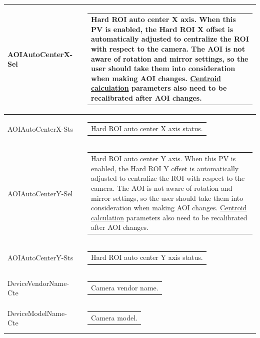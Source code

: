 \documentclass[openany]{article}
\begin{document}
\begin{longtable}{| m{3.0cm} m{4.5cm} m{7.0cm} |}
        AOIAutoCenterX-Sel &  & \begin{tabular}{@{}m{6cm}@{}}
                Hard ROI auto center X axis. When this PV is enabled, the Hard ROI X offset 
                is automatically adjusted to centralize the ROI with respect to the camera.
                The AOI is not aware of rotation and mirror settings, so the user should
                take them into consideration when making AOI changes.
                \hyperref[sec:centroid-calc]{Centroid calculation} parameters also need to
                be recalibrated after AOI changes.
            \end{tabular} \\ \hline
        AOIAutoCenterX-Sts &  & \begin{tabular}{@{}m{6cm}@{}}
                Hard ROI auto center X axis status.
            \end{tabular} \hypertarget{pv:hard-roi-auto-center-y}{}\\ \hline
        AOIAutoCenterY-Sel &  & \begin{tabular}{@{}m{6cm}@{}}
                Hard ROI auto center Y axis. When this PV is enabled, the Hard ROI Y offset 
                is automatically adjusted to centralize the ROI with respect to the camera.
                The AOI is not aware of rotation and mirror settings, so the user should
                take them into consideration when making AOI changes.
                \hyperref[sec:centroid-calc]{Centroid calculation} parameters also need to
                be recalibrated after AOI changes.
            \end{tabular} \\ \hline
        AOIAutoCenterY-Sts &  & \begin{tabular}{@{}m{6cm}@{}}
                Hard ROI auto center Y axis status.
            \end{tabular} \hypertarget{pv:vendor-name}{}\\ \hline
        DeviceVendorName-Cte &  & \begin{tabular}{@{}m{6cm}@{}}
                Camera vendor name.
            \end{tabular} \hypertarget{pv:device-model}{}\\ \hline
        DeviceModelName-Cte &  & \begin{tabular}{@{}m{6cm}@{}}
                Camera model.
            \end{tabular} \hypertarget{pv:device-version}{}\\ \hline

\end{longtable}
\end{document}
